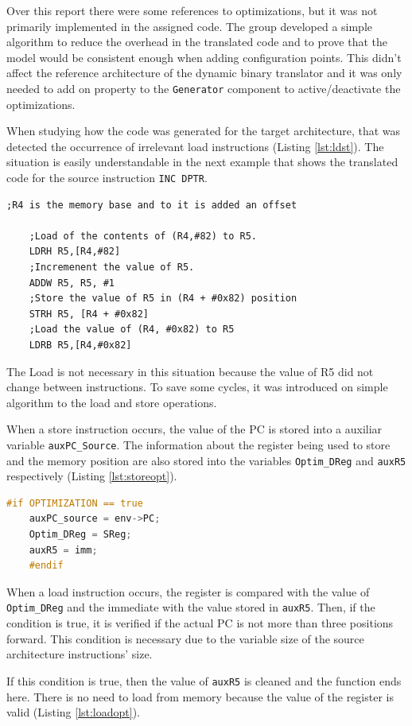\par Over this report there were some references to optimizations, but it was not primarily implemented in the assigned code. The group developed a simple algorithm to reduce the overhead in the translated code and to prove that the model would be consistent enough when adding configuration points. This didn't affect the reference architecture of the dynamic binary translator and it was only needed to add on property to the \texttt{Generator} component to active/deactivate the optimizations.
\par When studying how the code was generated for the target architecture, that was detected the occurrence of irrelevant load instructions (Listing \ref{lst:ldst}). The situation is easily understandable in the next example that shows the translated code for the source instruction \texttt{INC DPTR}.
\begin{lstlisting}[language={[x86masm]Assembler},caption=Fragment of the generated code from DBT.,label=lst:ldst]
	;R4 is the memory base and to it is added an offset
	
	;Load of the contents of (R4,#82) to R5.	
	LDRH R5,[R4,#82]
	;Incremenent the value of R5.
	ADDW R5, R5, #1
	;Store the value of R5 in (R4 + #0x82) position
	STRH R5, [R4 + #0x82]
	;Load the value of (R4, #0x82) to R5
	LDRB R5,[R4,#0x82]
\end{lstlisting}

\par The Load is not necessary in this situation because the value of R5 did not change between instructions. To save some cycles, it was introduced on simple algorithm to the load and store operations.
\par When a store instruction occurs, the value of the PC is stored into a auxiliar variable \texttt{auxPC\_Source}. The information about the register being used to store and the memory position are also stored into the variables \texttt{Optim\_DReg} and \texttt{auxR5} respectively (Listing \ref{lst:storeopt}). 

\begin{lstlisting}[language=C++,caption=Store function optimization code.,label=lst:storeopt]
	#if OPTIMIZATION == true
	auxPC_source = env->PC;
	Optim_DReg = SReg;
	auxR5 = imm; 
	#endif
\end{lstlisting}
\par When a load instruction occurs, the register is compared with the value of \texttt{Optim\_DReg} and the immediate with the value stored in \texttt{auxR5}. Then, if the condition is true, it is verified if the actual PC is not more than three positions forward. This condition is necessary due to the variable size of the source architecture instructions' size. 
\par If this condition is true, then the value of \texttt{auxR5} is cleaned and the function ends here. There is no need to load from memory because the value of the register is valid (Listing \ref{lst:loadopt}). 

